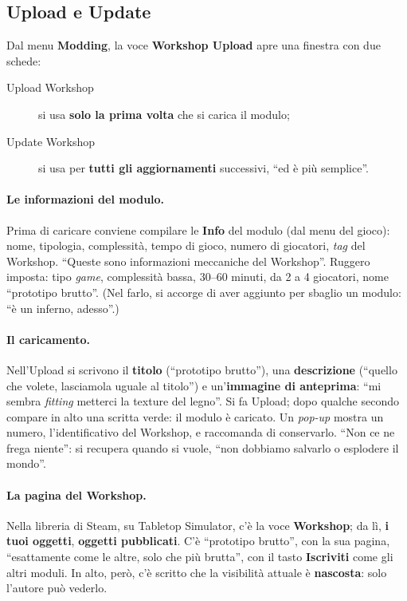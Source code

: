 \subsection{Upload e Update}
\label{a8:sec:upload}

Dal menu \textbf{Modding}, la voce \textbf{Workshop Upload} apre una finestra con due
schede:
\begin{description}
  \item[Upload Workshop] si usa \textbf{solo la prima volta} che si carica il
        modulo;
  \item[Update Workshop] si usa per \textbf{tutti gli aggiornamenti} successivi, ``ed
        è più semplice''.
\end{description}

\paragraph{Le informazioni del modulo.} Prima di caricare conviene compilare le
\textbf{Info} del modulo (dal menu del gioco): nome, tipologia, complessità, tempo di
gioco, numero di giocatori, \emph{tag} del Workshop. ``Queste sono informazioni
meccaniche del Workshop''. Ruggero imposta: tipo \emph{game}, complessità bassa,
30--60 minuti, da 2 a 4 giocatori, nome ``prototipo brutto''. (Nel farlo, si accorge di
aver aggiunto per sbaglio un modulo: ``è un inferno, adesso''.)

\paragraph{Il caricamento.} Nell'Upload si scrivono il \textbf{titolo} (``prototipo
brutto''), una \textbf{descrizione} (``quello che volete, lasciamola uguale al
titolo'') e un'\textbf{immagine di anteprima}: ``mi sembra \emph{fitting} metterci la
texture del legno''. Si fa Upload; dopo qualche secondo compare in alto una scritta
verde: il modulo è caricato. Un \emph{pop-up} mostra un numero, l'identificativo del
Workshop, e raccomanda di conservarlo. ``Non ce ne frega niente'': si recupera quando
si vuole, ``non dobbiamo salvarlo o esplodere il mondo''.

\paragraph{La pagina del Workshop.} Nella libreria di Steam, su Tabletop Simulator, c'è
la voce \textbf{Workshop}; da lì, \textbf{i tuoi oggetti}, \textbf{oggetti
pubblicati}. C'è ``prototipo brutto'', con la sua pagina, ``esattamente come le
altre, solo che più brutta'', con il tasto \textbf{Iscriviti} come gli altri moduli.
In alto, però, c'è scritto che la visibilità attuale è \textbf{nascosta}: solo l'autore
può vederlo.

